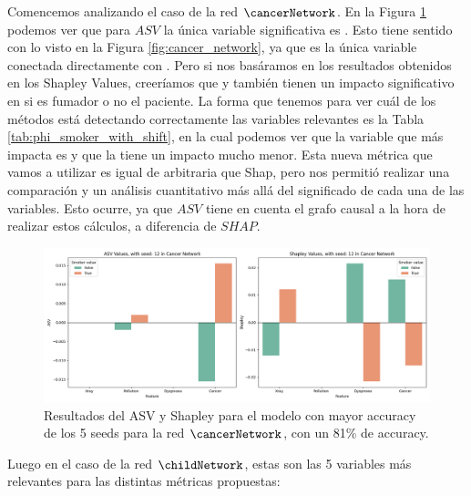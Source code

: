 Comencemos analizando el caso de la red $\cancerNetwork$. En la Figura \ref{fig:shapleyVsASVSingleSeedCancer} podemos ver que para $ASV$ la única variable significativa es . Esto tiene sentido con lo visto en la Figura \ref{fig:cancer_network}, ya que es la única variable conectada directamente con . Pero si nos basáramos en los resultados obtenidos en los Shapley Values, creeríamos que  y  también tienen un impacto significativo en si es fumador o no el paciente. La forma que tenemos para ver cuál de los métodos está detectando correctamente las variables relevantes es la Tabla \ref{tab:phi_smoker_with_shift}, en la cual podemos ver que la variable que más impacta es  y que la  tiene un impacto mucho menor. Esta nueva métrica que vamos a utilizar es igual de arbitraria que Shap, pero nos permitió realizar una comparación y un análisis cuantitativo más allá del significado de cada una de las variables.
Esto ocurre, ya que $ASV$ tiene en cuenta el grafo causal a la hora de realizar estos cálculos, a diferencia de $SHAP$. 

\begin{figure}
    \centering
    \includegraphics[width=1\linewidth]{img/asvResults/cancerASVAndShapleyExactASVAndShapley.png}
    \caption{Resultados del ASV y Shapley para el modelo con mayor accuracy de los 5 seeds para la red $\cancerNetwork$, con un 81\% de accuracy. }
    \label{fig:shapleyVsASVSingleSeedCancer}
\end{figure}

Luego en el caso de la red $\childNetwork$, estas son las 5 variables más relevantes para las distintas métricas propuestas:

